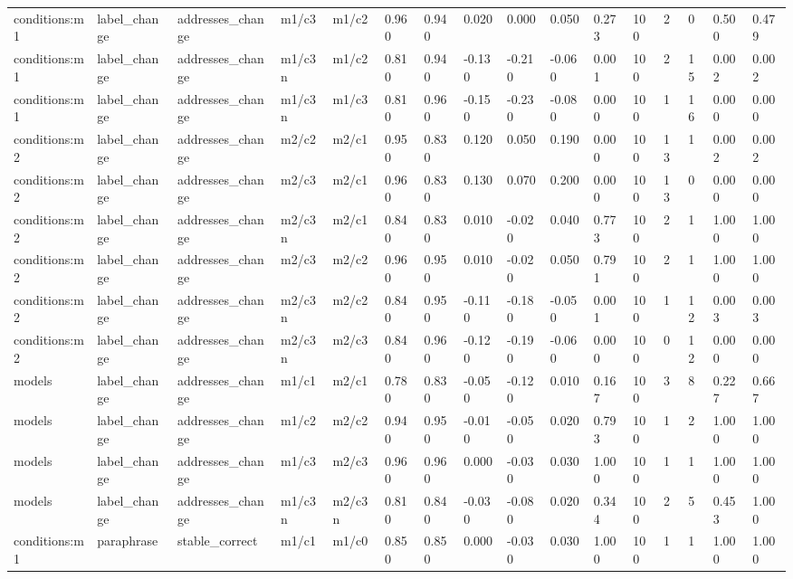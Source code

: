 \begin{tabular}{llllllllllllllll}
conditions:m1 & label\_change & addresses\_change & m1/c3 & m1/c2 & 0.960 & 0.940 & 0.020 & 0.000 & 0.050 & 0.273 & 100 & 2 & 0 & 0.500 & 0.479 \\
conditions:m1 & label\_change & addresses\_change & m1/c3n & m1/c2 & 0.810 & 0.940 & -0.130 & -0.210 & -0.060 & 0.001 & 100 & 2 & 15 & 0.002 & 0.002 \\
conditions:m1 & label\_change & addresses\_change & m1/c3n & m1/c3 & 0.810 & 0.960 & -0.150 & -0.230 & -0.080 & 0.000 & 100 & 1 & 16 & 0.000 & 0.000 \\
conditions:m2 & label\_change & addresses\_change & m2/c2 & m2/c1 & 0.950 & 0.830 & 0.120 & 0.050 & 0.190 & 0.000 & 100 & 13 & 1 & 0.002 & 0.002 \\
conditions:m2 & label\_change & addresses\_change & m2/c3 & m2/c1 & 0.960 & 0.830 & 0.130 & 0.070 & 0.200 & 0.000 & 100 & 13 & 0 & 0.000 & 0.000 \\
conditions:m2 & label\_change & addresses\_change & m2/c3n & m2/c1 & 0.840 & 0.830 & 0.010 & -0.020 & 0.040 & 0.773 & 100 & 2 & 1 & 1.000 & 1.000 \\
conditions:m2 & label\_change & addresses\_change & m2/c3 & m2/c2 & 0.960 & 0.950 & 0.010 & -0.020 & 0.050 & 0.791 & 100 & 2 & 1 & 1.000 & 1.000 \\
conditions:m2 & label\_change & addresses\_change & m2/c3n & m2/c2 & 0.840 & 0.950 & -0.110 & -0.180 & -0.050 & 0.001 & 100 & 1 & 12 & 0.003 & 0.003 \\
conditions:m2 & label\_change & addresses\_change & m2/c3n & m2/c3 & 0.840 & 0.960 & -0.120 & -0.190 & -0.060 & 0.000 & 100 & 0 & 12 & 0.000 & 0.000 \\
models & label\_change & addresses\_change & m1/c1 & m2/c1 & 0.780 & 0.830 & -0.050 & -0.120 & 0.010 & 0.167 & 100 & 3 & 8 & 0.227 & 0.667 \\
models & label\_change & addresses\_change & m1/c2 & m2/c2 & 0.940 & 0.950 & -0.010 & -0.050 & 0.020 & 0.793 & 100 & 1 & 2 & 1.000 & 1.000 \\
models & label\_change & addresses\_change & m1/c3 & m2/c3 & 0.960 & 0.960 & 0.000 & -0.030 & 0.030 & 1.000 & 100 & 1 & 1 & 1.000 & 1.000 \\
models & label\_change & addresses\_change & m1/c3n & m2/c3n & 0.810 & 0.840 & -0.030 & -0.080 & 0.020 & 0.344 & 100 & 2 & 5 & 0.453 & 1.000 \\
conditions:m1 & paraphrase & stable\_correct & m1/c1 & m1/c0 & 0.850 & 0.850 & 0.000 & -0.030 & 0.030 & 1.000 & 100 & 1 & 1 & 1.000 & 1.000 \\

\end{tabular}
